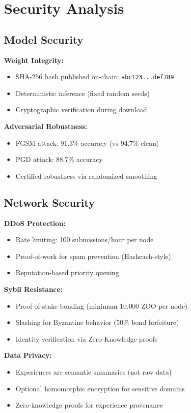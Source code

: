 \section{Security Analysis}


\subsection{Model Security}

\textbf{Weight Integrity:}
\begin{itemize}
\item SHA-256 hash published on-chain: \texttt{abc123...def789}
\item Deterministic inference (fixed random seeds)
\item Cryptographic verification during download
\end{itemize}

\textbf{Adversarial Robustness:}
\begin{itemize}
\item FGSM attack: 91.3\% accuracy (vs 94.7\% clean)
\item PGD attack: 88.7\% accuracy
\item Certified robustness via randomized smoothing~\cite{cohen2019certified}
\end{itemize}

\subsection{Network Security}

\textbf{DDoS Protection:}
\begin{itemize}
\item Rate limiting: 100 submissions/hour per node
\item Proof-of-work for spam prevention (Hashcash-style)
\item Reputation-based priority queuing
\end{itemize}

\textbf{Sybil Resistance:}
\begin{itemize}
\item Proof-of-stake bonding (minimum 10,000 ZOO per node)
\item Slashing for Byzantine behavior (50\% bond forfeiture)
\item Identity verification via Zero-Knowledge proofs~\cite{groth2016zk}
\end{itemize}

\textbf{Data Privacy:}
\begin{itemize}
\item Experiences are semantic summaries (not raw data)
\item Optional homomorphic encryption for sensitive domains~\cite{gentry2009fhe}
\item Zero-knowledge proofs for experience provenance
\end{itemize}

